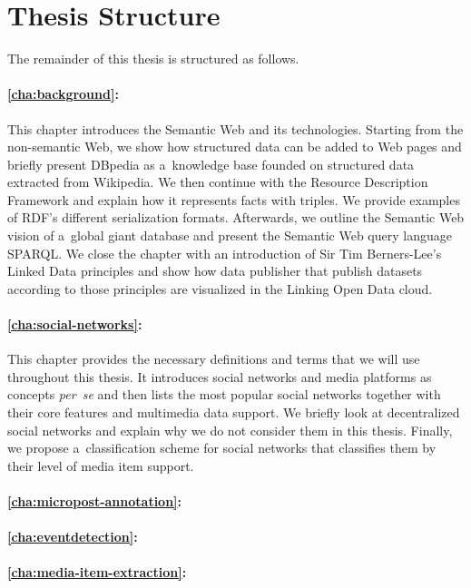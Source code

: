 \section{Thesis Structure}

The remainder of this thesis is structured as follows. 

\paragraph{\autoref{cha:background}:}

This chapter introduces the Semantic Web and its technologies.
Starting from the non-semantic Web,
we show how structured data can be added to Web pages
and briefly present DBpedia as a~knowledge base
founded on structured data extracted from Wikipedia.
We then continue with the Resource Description Framework
and explain how it represents facts with triples.
We provide examples of RDF's different serialization formats.
Afterwards, we outline the Semantic Web vision of
a~global giant database and present the Semantic Web
query language SPARQL.
We close the chapter with an introduction of Sir Tim Berners-Lee's
Linked Data principles and show how data publisher that publish
datasets according to those principles are visualized in the
Linking Open Data cloud.

\paragraph{\autoref{cha:social-networks}:}

This chapter provides the necessary definitions and terms
that we will use throughout this thesis. 
It introduces social networks and media platforms as concepts
\emph{per~se} and then lists the most popular social networks
together with their core features and multimedia data support.
We briefly look at decentralized social networks and explain
why we do not consider them in this thesis.
Finally, we propose a~classification scheme for social networks
that classifies them by their level of media item support.

\paragraph{\autoref{cha:micropost-annotation}:}
\paragraph{\autoref{cha:eventdetection}:}
\paragraph{\autoref{cha:media-item-extraction}:}
